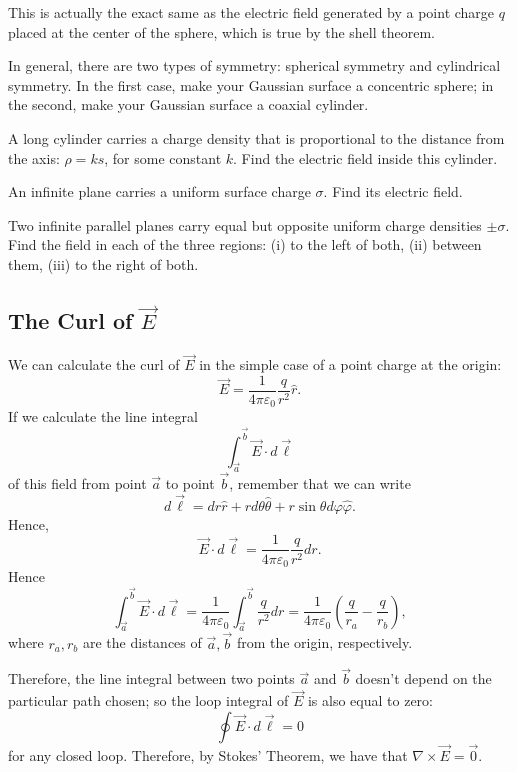 This is actually the exact same as the electric field generated by a point charge $q$ placed at the center of the sphere, which is true by the shell theorem. 

In general, there are two types of symmetry: spherical symmetry and cylindrical symmetry. In the first case, make your Gaussian surface a concentric sphere; in the second, make your Gaussian surface a coaxial cylinder.

\begin{exercise}
A long cylinder carries a charge density that is proportional to the distance from the axis: $\rho=ks$, for some constant $k$. Find the electric field inside this cylinder.
\end{exercise}

\begin{exercise}
An infinite plane carries a uniform surface charge $\sigma$. Find its electric field.
\end{exercise}

\begin{exercise}
Two infinite parallel planes carry equal but opposite uniform charge densities $\pm \sigma$. Find the field in each of the three regions: (i) to the left of both, (ii) between them, (iii) to the right of both.
\end{exercise}

\subsection{The Curl of $\vec{E}$}

We can calculate the curl of $\vec{E}$ in the simple case of a point charge at the origin:
\[\vec{E}=\frac{1}{4\pi\varepsilon_0}\frac{q}{r^2}\hat{r}.\]
If we calculate the line integral 
\[\int_{\vec{a}}^{\vec{b}}\vec{E}\cdot d\vec{\ell}\]
of this field from point $\vec{a}$ to point $\vec{b}$, remember that we can write
\[d\vec{\ell}=dr\hat{r}+rd\theta\hat{\theta}+r\sin\theta d\varphi \hat{\varphi}.\]
Hence,
\[\vec{E}\cdot d\vec{\ell}=\frac{1}{4\pi\varepsilon_0}\frac{q}{r^2}dr.\]
Hence
\[\int_{\vec{a}}^{\vec{b}}\vec{E}\cdot d\vec{\ell}=\frac{1}{4\pi\varepsilon_0}\int_{\vec{a}}^{\vec{b}}\frac{q}{r^2}dr=\frac{1}{4\pi\varepsilon_0}\left(\frac{q}{r_a}-\frac{q}{r_b}\right),\]
where $r_a,r_b$ are the distances of $\vec{a},\vec{b}$ from the origin, respectively.

Therefore, the line integral between two points $\vec{a}$ and $\vec{b}$ doesn't depend on the particular path chosen; so the loop integral of $\vec{E}$ is also equal to zero:
\[\oint \vec{E}\cdot d\vec{\ell}=0\]
for any closed loop. Therefore, by Stokes' Theorem, we have that $\nabla\times\vec{E}=\vec{0}$.

